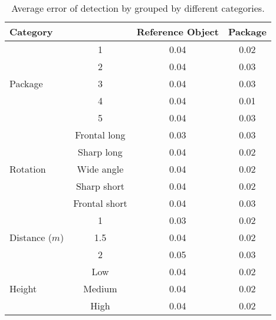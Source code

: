 \begin{table}%
\centering
\begin{tabular}{lccc}
\toprule
\multicolumn{2}{l}{Category} & Reference Object & Package\\
\midrule

\multirow{5}{*}{Package} 
& 1 & 0.04 & 0.02\\ 
& 2 & 0.04 & 0.03\\
& 3 & 0.04 & 0.03\\
& 4 & 0.04 & 0.01\\
& 5 & 0.04 & 0.03\\
\midrule

\multirow{5}{*}{Rotation}
& Frontal long		& 0.03 & 0.03 \\ 
& Sharp long	& 0.04 & 0.02 \\
& Wide angle 	& 0.04 & 0.02 \\
& Sharp short 	& 0.04 & 0.02 \\
& Frontal short	& 0.04 & 0.03 \\
\midrule
\multirow{3}{*}{Distance ($m$)} 
& 1 			& 0.03 & 0.02  \\ 
& 1.5  			& 0.04 & 0.02  \\
& 2 			& 0.05 & 0.03  \\
\midrule
\multirow{3}{*}{Height} 
& Low 		& 0.04 & 0.02 \\ 
& Medium 	& 0.04 & 0.02 \\
& High		& 0.04 & 0.02 \\
\bottomrule
 \end{tabular}
 \caption{Average error of detection by grouped by different categories.}
\label{table:detection_categories_error}
\end{table}
